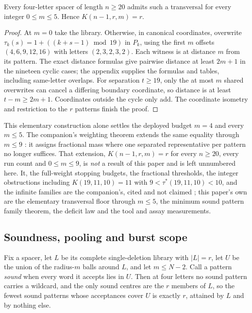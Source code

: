 \begin{theorem}\label{thm:general}
Every four-letter spacer of length $n\ge20$ admits such a transversal for every
integer $0\le m\le5$. Hence $K(n-1,r,m)=r$.
\end{theorem}
\begin{proof}
At $m=0$ take the library. Otherwise, in canonical coordinates, overwrite
$\tau_k(s)=1+((k+s-1)\bmod19)$ in $P_k$, using the first $m$ offsets
$(4,6,9,12,16)$ with letters $(2,3,2,3,2)$. Each witness is at distance $m$
from its pattern. The exact distance formulas give pairwise distance at least
$2m+1$ in the nineteen cyclic cases; the appendix supplies the formulas and tables,
including same-letter overlaps. For separation $t\ge19$, only the at most $m$
shared overwrites can cancel a differing boundary coordinate, so distance is at least
$t-m\ge2m+1$. Coordinates outside the cycle only add. The coordinate isometry
and restriction to the $r$ patterns finish the proof.
\end{proof}

This elementary construction alone settles the deployed budget $m=4$ and every
$m\le5$. The companion's weighting theorem extends the same equality through
$m\le9$ \citep{companion_reach}: it assigns fractional mass where one separated
representative per pattern no longer suffices.
That extension, $K(n-1,r,m)=r$ for every $n\ge20$, every run count and $0\le m\le9$, is
\emph{not} a result of this paper and is left unnumbered here. It, the full-weight stopping
budgets, the fractional thresholds, the integer obstructions including $K(19,11,10)=11$ with
$9<\tau^*(19,11,10)<10$, and the infinite families are the companion's, cited and not claimed
\citep{companion_reach}; this paper's own are the elementary transversal floor through $m\le5$,
the minimum sound pattern family theorem, the deficit law and the tool and assay measurements.

\subsection{Soundness, pooling and burst scope}

\begin{theorem}\label{thm:sound}
Fix a spacer, let $L$ be its complete single-deletion library with $\lvert L\rvert=r$, let $U$ be the
union of the radius-$m$ balls around $L$, and let $m\le N-2$. Call a pattern \emph{sound} when every
word it accepts lies in $U$. Then at four letters no sound pattern carries a wildcard, and
the only sound centres are the $r$ members of $L$, so the fewest sound patterns whose acceptances
cover $U$ is exactly $r$, attained by $L$ and by nothing else.
\end{theorem}

